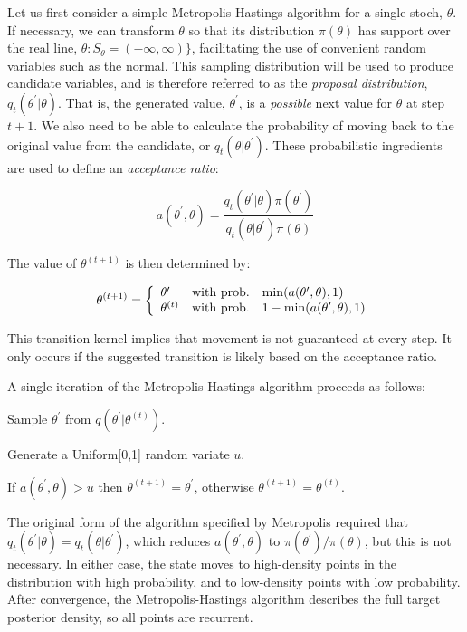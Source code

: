 \documentclass[]{book}
\begin{document}
Let us first consider a simple Metropolis-Hastings algorithm for a single stoch, $\theta$. If necessary, we can transform $\theta$ so that its distribution $\pi(\theta)$ has support over the real line, $\theta:S_{\theta} = (-\infty,\infty)\}$, facilitating the use of convenient random variables such as the normal. This sampling distribution will be used to produce candidate variables, and is therefore referred to as the \emph{proposal distribution}, $q_t(\theta^{\prime} | \theta)$. That is, the generated value, $\theta^{\prime}$, is a \emph{possible} next value for $\theta$ at step $t+1$. We also need to be able to calculate the probability of moving back to the original value from the candidate, or $q_t(\theta | \theta^{\prime})$. These probabilistic ingredients are used to define an \emph{acceptance ratio}:

\[
a(\theta^{\prime},\theta) = \frac{q_t(\theta^{\prime} | \theta) \pi(\theta^{\prime})}{q_t(\theta | \theta^{\prime}) \pi(\theta)}
\]

\noindent The value of $\theta^{(t+1)}$ is then determined by:

\[
\theta^{(t+1)} = \left\{\begin{array}{l@{\quad \mbox{with prob.} \quad}l}\theta^{\prime} & \min(a(\theta^{\prime},\theta),1) \\ \theta^{(t)} & 1 - \min(a(\theta^{\prime},\theta),1) \end{array}\right.
\]

\noindent This transition kernel implies that movement is not guaranteed at every step. It only occurs if the suggested transition is likely based on the acceptance ratio.

A single iteration of the Metropolis-Hastings algorithm proceeds as follows:

\begin{list}{}
{}
\item Sample $\theta^{\prime}$ from $q(\theta^{\prime} | \theta^{(t)})$.
\item Generate a Uniform[0,1] random variate $u$.
\item If $a(\theta^{\prime},\theta) > u$ then $\theta^{(t+1)} = \theta^{\prime}$, otherwise $\theta^{(t+1)} = \theta^{(t)}$.
\end{list}

\noindent The original form of the algorithm specified by Metropolis required that $q_t(\theta^{\prime} | \theta) = q_t(\theta | \theta^{\prime})$, which reduces $a(\theta^{\prime},\theta)$ to $\pi(\theta^{\prime})/\pi(\theta)$, but this is not necessary. In either case, the state moves to high-density points in the distribution with high probability, and to low-density points with low probability. After convergence, the Metropolis-Hastings algorithm describes the full target posterior density, so all points are recurrent.
\end{document}
